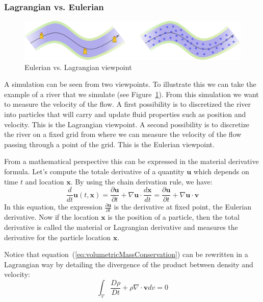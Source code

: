 \subsubsection{Lagrangian vs. Eulerian}

\begin{figure}[!ht]
\centering
\includegraphics[scale=0.5]{images/continuum_mechanics/eulerianVsLagrangian.png}
\caption[STAR mechanics: Eulerian vs. Lagrangian]{\label{fig:EulerianVsLagrangian} Eulerian vs. Lagrangian viewpoint}
\end{figure}

A simulation can be seen from two viewpoints. To illustrate this we can take the example of a river that we simulate (see Figure~\ref{fig:EulerianVsLagrangian}). From this simulation we want to measure the velocity of the flow. A first possibility is to discretized the river into particles that will carry and update fluid properties such as position and velocity. This is the Lagrangian viewpoint. A second possibility is to discretize the river on a fixed grid from where we can measure the velocity of the flow passing through a point of the grid. This is the Eulerian viewpoint.

From a mathematical perspective this can be expressed in the material derivative formula. Let's compute the totale derivative of a quantity $\mathbf{u}$ which depends on time $t$ and location $\mathbf{x}$. By using the chain derivation rule, we have:
\begin{equation}
\frac{d}{dt}\mathbf{u}(t,\mathbf{x}) = 
\frac{\partial \mathbf{u}}{\partial t} + \nabla \mathbf{u} \cdot \frac{d\mathbf{x}}{dt} =
\frac{\partial \mathbf{u}}{\partial t} + \nabla \mathbf{u} \cdot \mathbf{v} 
\end{equation}
In this equation, the expression $\frac{\partial \mathbf{u}}{\partial t}$ is the derivative at fixed point, the Eulerian derivative. Now if the location $\mathbf{x}$ is the position of a particle, then the total derivative is called the material or Lagrangian derivative and measures the derivative for the particle location $\mathbf{x}$.

Notice that equation~(\ref{eq:volumetricMassConservation}) can be rewritten in a Lagrangian way by detailing the divergence of the product between density and velocity:
\begin{equation}
\label{eq:lagrangianMassConservation}
\int_{\mathcal{V}} \frac{D\rho}{Dt} + \rho \nabla \cdot \mathbf{v} dv = 0
\end{equation}

